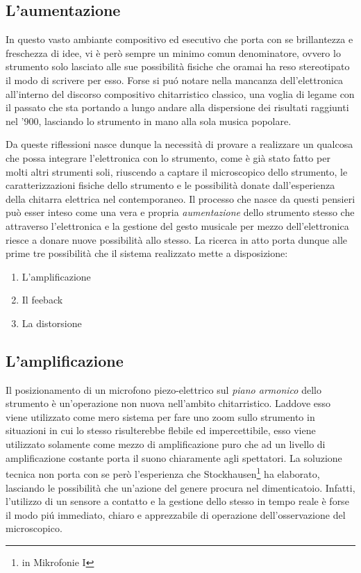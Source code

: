 \documentclass[oneside]{article}
\begin{document}
\begin{multicols*}{2}

\section{ L’aumentazione}

In questo vasto ambiante compositivo ed esecutivo che porta con se brillantezza e freschezza di idee, vi è però sempre un minimo comun denominatore, ovvero lo strumento solo lasciato alle sue possibilità fisiche che oramai ha reso stereotipato il modo di scrivere per esso. Forse si puó notare nella mancanza dell'elettronica all'interno del discorso compositivo chitarristico classico, una voglia di legame con il passato che sta portando a lungo andare alla dispersione dei risultati raggiunti nel '900, lasciando lo strumento in mano alla sola musica popolare. 

\noindent Da queste riflessioni nasce dunque la necessità di provare a realizzare un qualcosa che possa integrare l'elettronica con lo strumento, come è già stato fatto per molti altri strumenti soli, riuscendo a captare il microscopico dello strumento, le caratterizzazioni fisiche dello strumento e le possibilità donate dall'esperienza della chitarra elettrica nel contemporaneo. Il processo che nasce da questi pensieri può esser inteso come una vera e propria \textit{aumentazione} dello strumento stesso che attraverso l'elettronica e la gestione del gesto musicale per mezzo dell'elettronica riesce a donare nuove possibilità allo stesso. La ricerca in atto porta dunque alle prime tre possibilità che il sistema realizzato mette a disposizione: 
\begin{enumerate}[label=(\roman*)]
\item L'amplificazione
\item Il feeback 
\item La distorsione
\end{enumerate}

\subsection{L'amplificazione} 
Il posizionamento di un microfono piezo-elettrico sul \textit{piano armonico} dello strumento è un'operazione non nuova nell'ambito chitarristico. Laddove esso viene utilizzato come mero sistema per fare uno zoom sullo strumento in situazioni in cui lo stesso risulterebbe flebile ed impercettibile, esso viene utilizzato solamente come mezzo di amplificazione puro che ad un livello di amplificazione costante porta il suono chiaramente agli spettatori. La soluzione tecnica non porta con se però l'esperienza che Stockhausen\footnote{in Mikrofonie I} ha elaborato, lasciando le possibilità che un'azione del genere procura nel dimenticatoio. Infatti, l'utilizzo di un sensore a contatto e la gestione dello stesso in tempo reale è forse il modo piú immediato, chiaro e apprezzabile di operazione dell'osservazione del microscopico.


\end{multicols*}
\end{document}
